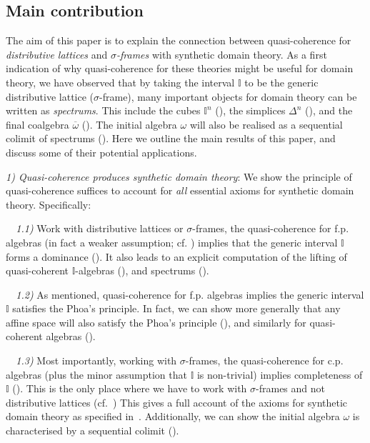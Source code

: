 \documentclass[12pt]{amsart}
\theoremstyle{definition}
\newcommand{\mbb}[1]{\mathbb{#1}}
\newcommand{\I}{\mbb I}
\newcommand{\ov}[1]{\overline{#1}}
\begin{document}
\subsection{Main contribution}

The aim of this paper is to explain the connection between quasi-coherence for \emph{distributive lattices} and \emph{$\sigma$-frames} with synthetic domain theory. As a first indication of why quasi-coherence for these theories might be useful for domain theory, we have observed that by taking the interval $\I$ to be the generic distributive lattice ($\sigma$-frame), many important objects for domain theory can be written as \emph{spectrums}. This include the cubes $\I^n$ (), the simplices $\Delta^n$ (), and the final coalgebra $\ov\omega$ (). The initial algebra $\omega$ will also be realised as a sequential colimit of spectrums (). Here we outline the main results of this paper, and discuss some of their potential applications.

\emph{1) Quasi-coherence produces synthetic domain theory}: We show the principle of quasi-coherence suffices to account for \emph{all} essential axioms for synthetic domain theory. Specifically:

\emph{\ \ 1.1)} Work with distributive lattices or $\sigma$-frames, the quasi-coherence for f.p. algebras (in fact a weaker assumption; cf. ) implies that the generic interval $\I$ forms a dominance (). It also leads to an explicit computation of the lifting of quasi-coherent $\I$-algebras (), and spectrums ().

\emph{\ \ 1.2)} As mentioned, quasi-coherence for f.p. algebras implies the generic interval $\I$ satisfies the Phoa's principle. In fact, we can show more generally that any affine space will also satisfy the Phoa's principle (), and similarly for quasi-coherent algebras ().

\emph{\ \ 1.3)} Most importantly, working with $\sigma$-frames, the quasi-coherence for c.p. algebras (plus the minor assumption that $\I$ is non-trivial) implies completeness of $\I$ (). This is the only place where we have to work with $\sigma$-frames and not distributive lattices (cf.~) This gives a full account of the axioms for synthetic domain theory as specified in~\cite{hyland2006first}. Additionally, we can show the initial algebra $\omega$ is characterised by a sequential colimit ().
\end{document}
